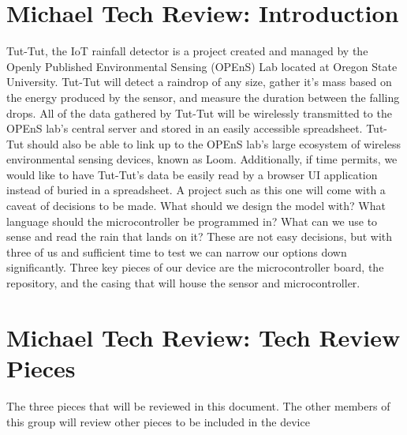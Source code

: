 \documentclass[letterpaper,10pt,draftclsnofoot,onecolumn]{article}
\begin{document}
\section{Michael Tech Review: Introduction}
Tut-Tut, the IoT rainfall detector is a project created and managed by the Openly Published Environmental Sensing (OPEnS) Lab located at Oregon State University. Tut-Tut will detect a raindrop of any size, gather it's mass based on the energy produced by the sensor, and measure the duration between the falling drops. All of the data gathered by Tut-Tut will be wirelessly transmitted to the OPEnS lab's central server and stored in an easily accessible spreadsheet. Tut-Tut should also be able to link up to the OPEnS lab's large ecosystem of wireless environmental sensing devices, known as Loom. Additionally, if time permits, we would like to have Tut-Tut's data be easily read by a browser UI application instead of buried in a spreadsheet.
\newline
\newline
A project such as this one will come with a caveat of decisions to be made. What should we design the model with? What language should the microcontroller be programmed in? What can we use to sense and read the rain that lands on it? These are not easy decisions, but with three of us and sufficient time to test we can narrow our options down significantly. Three key pieces of our device are the microcontroller board, the repository, and the casing that will house the sensor and microcontroller. 

\section{Michael Tech Review: Tech Review Pieces}
The three pieces that will be reviewed in this document. The other members of this group will review other pieces to be included in the device
\end{document}

